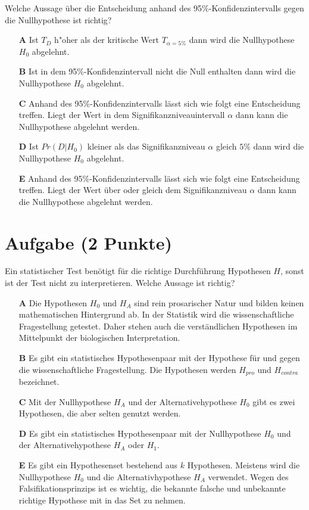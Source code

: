 \documentclass[a4paper, 9pt]{scrartcl}\usepackage[]{graphicx}\usepackage[]{xcolor}
\begin{document}
Welche Aussage über die Entscheidung anhand des 95\%-Konfidenzintervalls gegen die
Nullhypothese ist richtig?



\begin{enumerate}
\item [\textbf{A} \msquare] Ist $T_{D}$ h{"o}her als der kritische Wert $T_{\alpha = 5\%}$ dann wird die Nullhypothese $H_0$ abgelehnt.
\item [\textbf{B} \msquare] Ist in dem 95\%-Konfidenzintervall nicht die Null enthalten dann wird die Nullhypothese $H_0$ abgelehnt.
\item [\textbf{C} \msquare] Anhand des 95\%-Konfidenzintervalls lässt sich wie folgt eine Entscheidung treffen. Liegt der Wert in dem Signifikanzniveauintervall $\alpha$ dann kann die Nullhypothese abgelehnt werden.
\item [\textbf{D} \msquare] Ist $Pr(D|H_0)$ kleiner als das Signifikanzniveau $\alpha$ gleich $5\%$ dann wird die Nullhypothese $H_0$ abgelehnt.
\item [\textbf{E} \msquare] Anhand des 95\%-Konfidenzintervalls lässt sich wie folgt eine Entscheidung treffen. Liegt der Wert über oder gleich dem Signifikanzniveau $\alpha$ dann kann die Nullhypothese abgelehnt werden.
\end{enumerate}

\section{Aufgabe \hfill (2 Punkte)}



Ein statistischer Test benötigt für die richtige Durchführung Hypothesen $H$, sonst ist der Test nicht zu interpretieren. Welche Aussage ist richtig?



\begin{enumerate}
\item [\textbf{A} \msquare] Die Hypothesen $H_0$ und $H_A$ sind rein prosarischer Natur und bilden keinen mathematischen Hintergrund ab. In der Statistik wird die wissenschaftliche Fragestellung getestet. Daher stehen auch die verständlichen Hypothesen im Mittelpunkt der biologischen Interpretation.
\item [\textbf{B} \msquare] Es gibt ein statistisches Hypothesenpaar mit der Hypothese für und gegen die wissenschaftliche Fragestellung. Die Hypothesen werden $H_{pro}$ und $H_{contra}$ bezeichnet.
\item [\textbf{C} \msquare] Mit der Nullhypothese $H_A$ und der Alternativehypothese $H_0$ gibt es zwei Hypothesen, die aber selten genutzt werden.
\item [\textbf{D} \msquare] Es gibt ein statistisches Hypothesenpaar mit der Nullhypothese $H_0$ und der Alternativehypothese $H_A$ oder $H_1$.
\item [\textbf{E} \msquare] Es gibt ein Hypothesenset bestehend aus $k$ Hypothesen. Meistens wird die Nullhypothese $H_0$ und die Alternativhypothese $H_A$ verwendet. Wegen des Falsifikationsprinzips ist es wichtig, die bekannte falsche und unbekannte richtige Hypothese mit in das Set zu nehmen.
\end{enumerate}
\end{document}

